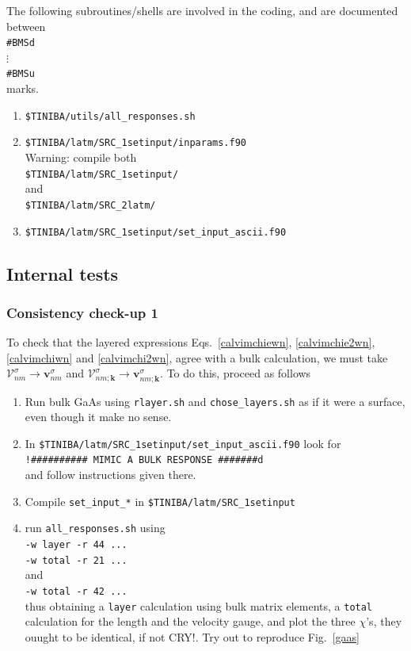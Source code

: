 The following subroutines/shells are involved in the coding,
and are documented between\\
\verb=#BMSd=\\
$\vdots$\\
\verb=#BMSu=\\
marks.
\begin{enumerate}
\item \verb=$TINIBA/utils/all_responses.sh=
\item \verb=$TINIBA/latm/SRC_1setinput/inparams.f90=\\
{\color{red} Warning:} compile both\\
\verb=$TINIBA/latm/SRC_1setinput/= \\
and\\
\verb=$TINIBA/latm/SRC_2latm/= 
\item \verb=$TINIBA/latm/SRC_1setinput/set_input_ascii.f90=\\
\end{enumerate}



\subsection{Internal tests}

\subsubsection{Consistency check-up 1}

To check that the layered expressions
Eqs.~\eqref{calvimchiewn}, \eqref{calvimchie2wn}, \eqref{calvimchiwn}
 and \eqref{calvimchi2wn}, agree with a bulk calculation, we must
 take 
$\boldsymbol{\mathcal{V}}^\sigma_{nm}\to\mathbf{v}^\sigma_{nm}$
and
$\boldsymbol{\mathcal{V}}^\sigma_{nm;\mathbf{k}}\to\mathbf{v}^\sigma_{nm;\mathbf{k}}$. To do this, proceed as
follows
\begin{enumerate}
\item Run bulk GaAs using  \verb=rlayer.sh= and \verb=chose_layers.sh=
as if it were a surface, even though it make no sense.
\item In \verb=$TINIBA/latm/SRC_1setinput/set_input_ascii.f90= look for\\
\verb=!########## MIMIC A BULK RESPONSE #######d=\\
and follow instructions given there.
\item Compile \verb=set_input_*= in \verb=$TINIBA/latm/SRC_1setinput=
\item run \verb=all_responses.sh= using\\ 
\verb=-w layer -r 44 ...=\\
\verb=-w total -r 21 ...=\\
and \\
\verb=-w total -r 42 ...=\\
thus obtaining a \verb=layer= calculation using bulk matrix elements, a
\verb=total= calculation for the length  and the velocity gauge, and plot the
three $\chi$'s, they ouught to be identical, if not CRY!. Try out to
reproduce Fig.~\ref{gaas}  
\end{enumerate}

